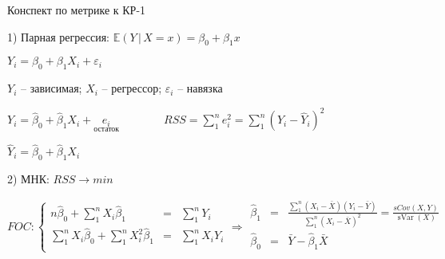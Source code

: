 \documentclass[12pt]{article}
\newcommand{\e}{\mathbb{E}}
\DeclareMathOperator{\svar}{sVar}
\renewcommand{\epsilon}{\varepsilon}
\begin{document}
	
\begin{center}
Конспект по метрике к КР-1
\end{center}

1) Парная регрессия: $\e (Y \, | \, X = x) = \beta_0 + \beta_1 x$

$Y_i = \beta_0 + \beta_1 X_i + \epsilon_i$ \qquad
\parbox{3cm}{$Y_i$ -- зависимая; $X_i$ -- регрессор; $\epsilon_i$ -- навязка}

$Y_i = \hat{\beta}_0 + \hat{\beta}_1 X_i + \underset{\text{остаток}}{e_i} \qquad \qquad RSS = \sum\limits_1^n e_i^2 = \sum\limits_1^n (Y_i - \hat{Y}_i)^2$

$\hat{Y}_i = \hat{\beta}_0 + \hat{\beta}_1 X_i$

2) МНК: $RSS \rightarrow min$

$FOC: \left\{
\begin{array}{rcl}
n \hat{\beta}_0 + \sum\limits_1^n X_i \hat{\beta}_1 & = &\sum\limits_1^n Y_i\\[6mm]
\sum\limits_1^n X_i \hat{\beta}_0 + \sum\limits_1^n X_i^2 \hat{\beta}_1 & = & \sum\limits_1^n X_i Y_i\\
\end{array}
\right.
\Rightarrow
\begin{array}{rcl}
\hat{\beta}_1 & = &  \frac{\sum\limits_1^n (X_i - \bar{X})(Y_i - \bar{Y})}{\sum\limits_1^n(X_i - \bar{X})^2} = \frac{sCov(X, Y)}{\svar(X)}\\[6mm]
\hat{\beta}_0 & = & \bar{Y} - \hat{\beta}_1 \bar{X}\\
\end{array}
$
\end{document}
